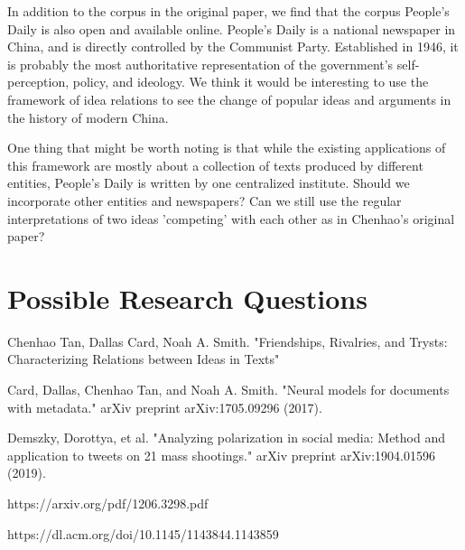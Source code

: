 \documentclass{article}
\begin{document}
In addition to the corpus in the original paper, we find that the corpus People's Daily is also open and available online. People's Daily is a national newspaper in China, and is directly controlled by the Communist Party. Established in 1946, it is probably the most authoritative representation of the government's self-perception, policy, and ideology. We think it would be interesting to use the framework of idea relations to see the change of popular ideas and arguments in the history of modern China. 

One thing that might be worth noting is that while the existing applications of this framework are mostly about a collection of texts produced by different entities, People's Daily is written by one centralized institute. Should we incorporate other entities and newspapers? Can we still use the regular interpretations of two ideas 'competing' with each other as in Chenhao's original paper?



\section{Possible Research Questions}







\begin{thebibliography}{999}

Chenhao Tan, Dallas Card, Noah A. Smith. "Friendships, Rivalries, and Trysts: Characterizing Relations between Ideas in Texts"

Card, Dallas, Chenhao Tan, and Noah A. Smith. "Neural models for documents with metadata." arXiv preprint arXiv:1705.09296 (2017).

Demszky, Dorottya, et al. "Analyzing polarization in social media: Method and application to tweets on 21 mass shootings." arXiv preprint arXiv:1904.01596 (2019).

https://arxiv.org/pdf/1206.3298.pdf

https://dl.acm.org/doi/10.1145/1143844.1143859
 
\end{thebibliography}
\end{document}
